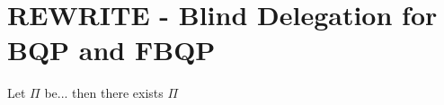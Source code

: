 \section{REWRITE - Blind Delegation for BQP and FBQP}
\label{sec:BlindBQP2}

Let $\Pi$ be...
then there exists $\Pi$
